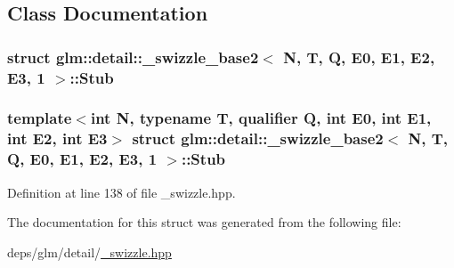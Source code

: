 \subsection{Class Documentation}
\label{structglm_1_1detail_1_1__swizzle__base2_3_01N_00_01T_00_01Q_00_01E0_00_01E1_00_01E2_00_01E3_00_011_01_4_1_1Stub}
\subsubsection{struct glm\+:\+:detail\+:\+:\+\_\+swizzle\+\_\+base2$<$ N, T, Q, E0, E1, E2, E3, 1 $>$\+:\+:Stub}
\subsubsection*{template$<$int N, typename T, qualifier Q, int E0, int E1, int E2, int E3$>$\newline
struct glm\+::detail\+::\+\_\+swizzle\+\_\+base2$<$ N, T, Q, E0, E1, E2, E3, 1 $>$\+::\+Stub}



Definition at line 138 of file \+\_\+swizzle.\+hpp.



The documentation for this struct was generated from the following file\+:\begin{DoxyCompactItemize}
\item 
deps/glm/detail/\hyperlink{__swizzle_8hpp}{\+\_\+swizzle.\+hpp}\end{DoxyCompactItemize}
